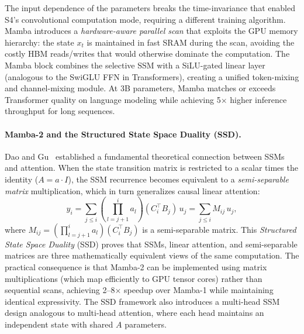 The input dependence of the parameters breaks the time-invariance that enabled S4's convolutional computation mode, requiring a different training algorithm. Mamba introduces a \emph{hardware-aware parallel scan} that exploits the GPU memory hierarchy: the state $x_t$ is maintained in fast SRAM during the scan, avoiding the costly HBM reads/writes that would otherwise dominate the computation. The Mamba block combines the selective SSM with a SiLU-gated linear layer (analogous to the SwiGLU FFN in Transformers), creating a unified token-mixing and channel-mixing module. At 3B parameters, Mamba matches or exceeds Transformer quality on language modeling while achieving 5$\times$ higher inference throughput for long sequences.

\paragraph{Mamba-2 and the Structured State Space Duality (SSD).}
Dao and Gu~\cite{dao2024transformers} established a fundamental theoretical connection between SSMs and attention. When the state transition matrix is restricted to a scalar times the identity ($A = a \cdot I$), the SSM recurrence becomes equivalent to a \emph{semi-separable matrix} multiplication, which in turn generalizes causal linear attention:
\begin{equation}
y_i = \sum_{j \leq i} \left(\prod_{l=j+1}^{i} a_l\right) (C_i^\top B_j)\, u_j = \sum_{j \leq i} M_{ij}\, u_j,
\label{eq:ssd}
\end{equation}
where $M_{ij} = (\prod_{l=j+1}^{i} a_l)(C_i^\top B_j)$ is a semi-separable matrix. This \emph{Structured State Space Duality} (SSD) proves that SSMs, linear attention, and semi-separable matrices are three mathematically equivalent views of the same computation. The practical consequence is that Mamba-2 can be implemented using matrix multiplications (which map efficiently to GPU tensor cores) rather than sequential scans, achieving 2--8$\times$ speedup over Mamba-1 while maintaining identical expressivity. The SSD framework also introduces a multi-head SSM design analogous to multi-head attention, where each head maintains an independent state with shared $A$ parameters.

